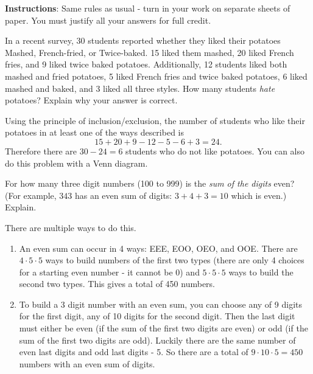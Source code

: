 \documentclass[11pt]{exam}
\begin{document}
\noindent \textbf{Instructions}: Same rules as usual - turn in your work on separate sheets of paper.  You must justify all your answers for full credit.

\begin{questions}



\question[4] In a recent survey, 30 students reported whether they liked their potatoes Mashed, French-fried, or Twice-baked. 15 liked them mashed, 20 liked French fries, and 9 liked twice baked potatoes. Additionally, 12 students liked both mashed and fried potatoes, 5 liked French fries and twice baked potatoes, 6 liked mashed and baked, and 3 liked all three styles. How many students
{\em hate} potatoes?  Explain why your answer is correct.

	\begin{solution}
	  Using the principle of inclusion/exclusion, the number of students who like their potatoes in at least one of the ways described is \[15 + 20 + 9 - 12 - 5 - 6 + 3 = 24.\]  Therefore there are $30-24 = 6$ students who do not like potatoes.  You can also do this problem with a Venn diagram.
	\end{solution}


\question[4] For how many three digit numbers (100 to 999) is the {\em sum of the digits} even? (For example, $343$ has an even sum of digits: $3+4+3 = 10$ which is even.)  Explain.

\begin{solution}
  There are multiple ways to do this.
  \begin{enumerate}
    \item An even sum can occur in 4 ways: EEE, EOO, OEO, and OOE.  There are $4 \cdot 5 \cdot 5$ ways to build numbers of the first two types (there are only 4 choices for a starting even number - it cannot be 0) and $5 \cdot 5 \cdot 5$ ways to build the second two types.  This gives a total of 450 numbers.
    \item To build a 3 digit number with an even sum, you can choose any of 9 digits for the first digit, any of 10 digits for the second digit.  Then the last digit must either be even (if the sum of the first two digits are even) or odd (if the sum of the first two digits are odd).  Luckily there are the same number of even last digits and odd last digits - 5.  So there are a total of $9 \cdot 10 \cdot 5 = 450$ numbers with an even sum of digits.
  \end{enumerate}
\end{solution}



\end{questions}
\end{document}
